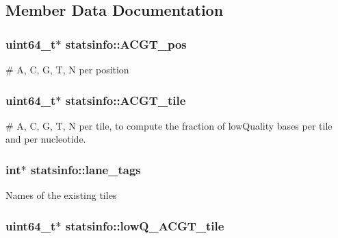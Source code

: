 \subsection{Member Data Documentation}
\hypertarget{structstatsinfo_a315b402bd89ea205117d2fab4b26ef10}{
\subsubsection[{A\+C\+G\+T\+\_\+pos}]{\setlength{\rightskip}{0pt plus 5cm}uint64\+\_\+t$\ast$ statsinfo\+::\+A\+C\+G\+T\+\_\+pos}}\label{structstatsinfo_a315b402bd89ea205117d2fab4b26ef10}
\# A, C, G, T, N per position \hypertarget{structstatsinfo_aa4987d17317a2d744efaa104f7a3e0b7}{
\subsubsection[{A\+C\+G\+T\+\_\+tile}]{\setlength{\rightskip}{0pt plus 5cm}uint64\+\_\+t$\ast$ statsinfo\+::\+A\+C\+G\+T\+\_\+tile}}\label{structstatsinfo_aa4987d17317a2d744efaa104f7a3e0b7}
\# A, C, G, T, N per tile, to compute the fraction of low\+Quality bases per tile and per nucleotide. \hypertarget{structstatsinfo_a2fc74c1d7cec79d9b28b5e578d96d7a1}{
\subsubsection[{lane\+\_\+tags}]{\setlength{\rightskip}{0pt plus 5cm}int$\ast$ statsinfo\+::lane\+\_\+tags}}\label{structstatsinfo_a2fc74c1d7cec79d9b28b5e578d96d7a1}
Names of the existing tiles \hypertarget{structstatsinfo_ac1a8b88e2e4f486f2767072588adcd2a}{
\subsubsection[{low\+Q\+\_\+\+A\+C\+G\+T\+\_\+tile}]{\setlength{\rightskip}{0pt plus 5cm}uint64\+\_\+t$\ast$ statsinfo\+::low\+Q\+\_\+\+A\+C\+G\+T\+\_\+tile}}\label{structstatsinfo_ac1a8b88e2e4f486f2767072588adcd2a}
